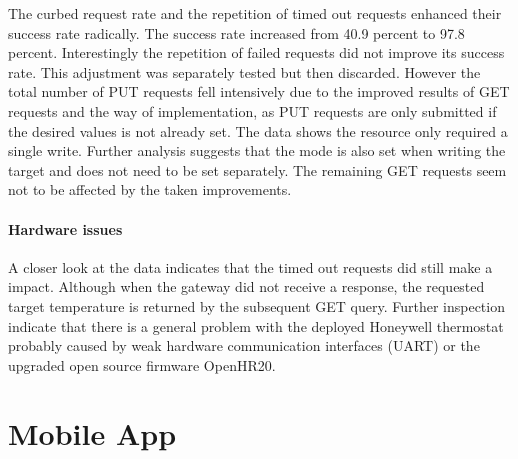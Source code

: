 The curbed request rate and the repetition of timed out  requests enhanced their success rate radically.
The success rate increased from 40.9 percent to 97.8 percent.
Interestingly the repetition of failed  requests did not improve its success rate.
This adjustment was separately tested but then discarded.
However the total number of PUT requests fell intensively due to the improved results of GET requests and the way of implementation, as PUT requests are only submitted if the desired values is not already set.
The data shows the resource  only required a single write.
Further analysis suggests that the mode is also set when writing the target and does not need to be set separately.
The remaining GET requests seem not to be affected by the taken improvements.

\paragraph{Hardware issues}

A closer look at the data indicates that the timed out  requests did still make a impact.
Although when the gateway did not receive a response, the requested target temperature is returned by the subsequent GET query.
Further inspection indicate that there is a general problem with the deployed Honeywell thermostat probably caused by weak hardware communication interfaces (UART) or the upgraded open source firmware OpenHR20.




\section{Mobile App}

